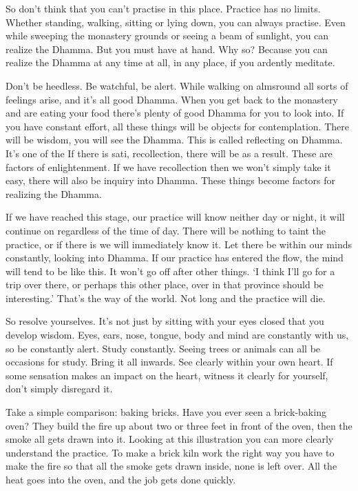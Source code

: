 So don't think that you can't practise in this place. Practice has no limits. Whether standing, walking, sitting or lying down, you can always practise. Even while sweeping the monastery grounds or seeing a beam of sunlight, you can realize the Dhamma. But you must have  at hand. Why so? Because you can realize the Dhamma at any time at all, in any place, if you ardently meditate.

Don't be heedless. Be watchful, be alert. While walking on almsround all sorts of feelings arise, and it's all good Dhamma. When you get back to the monastery and are eating your food there's plenty of good Dhamma for you to look into. If you have constant effort, all these things will be objects for contemplation. There will be wisdom, you will see the Dhamma. This is called  reflecting on Dhamma. It's one of the  If there is sati, recollection, there will be  as a result. These are factors of enlightenment. If we have recollection then we won't simply take it easy, there will also be inquiry into Dhamma. These things become factors for realizing the Dhamma.

If we have reached this stage, our practice will know neither day or night, it will continue on regardless of the time of day. There will be nothing to taint the practice, or if there is we will immediately know it. Let there be  within our minds constantly, looking into Dhamma. If our practice has entered the flow, the mind will tend to be like this. It won't go off after other things. `I think I'll go for a trip over there, or perhaps this other place, over in that province should be interesting.' That's the way of the world. Not long and the practice will die.

So resolve yourselves. It's not just by sitting with your eyes closed that you develop wisdom. Eyes, ears, nose, tongue, body and mind are constantly with us, so be constantly alert. Study constantly. Seeing trees or animals can all be occasions for study. Bring it all inwards. See clearly within your own heart. If some sensation makes an impact on the heart, witness it clearly for yourself, don't simply disregard it.

Take a simple comparison: baking bricks. Have you ever seen a brick-baking oven? They build the fire up about two or three feet in front of the oven, then the smoke all gets drawn into it. Looking at this illustration you can more clearly understand the practice. To make a brick kiln work the right way you have to make the fire so that all the smoke gets drawn inside, none is left over. All the heat goes into the oven, and the job gets done quickly.

